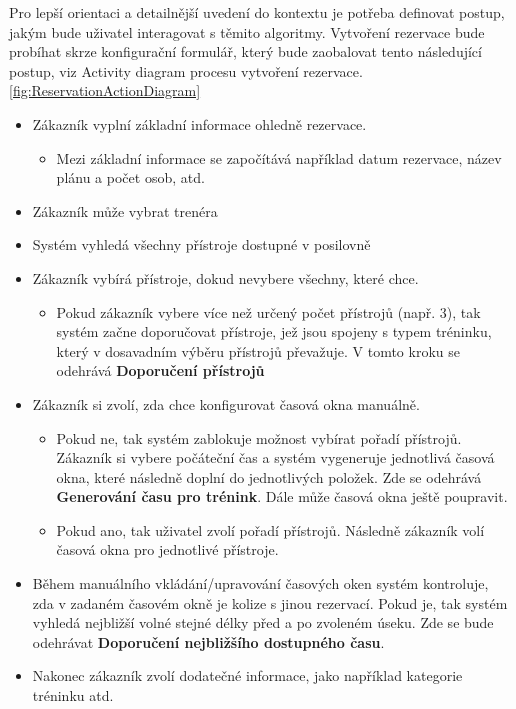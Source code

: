Pro lepší orientaci a detailnější uvedení do kontextu je potřeba definovat postup, jakým bude uživatel interagovat s těmito algoritmy. Vytvoření rezervace bude probíhat skrze konfigurační formulář, který bude zaobalovat tento následující postup, viz Activity diagram procesu vytvoření rezervace. \ref{fig:ReservationActionDiagram}
\begin{itemize}
  \item Zákazník vyplní základní informace ohledně rezervace.
    \begin{itemize}
      \item Mezi základní informace se započítává například datum rezervace, název plánu a počet osob, atd.
    \end{itemize}
  \item Zákazník může vybrat trenéra
  \item Systém vyhledá všechny přístroje dostupné v posilovně
  \item Zákazník vybírá přístroje, dokud nevybere všechny, které chce.
    \begin{itemize}
        \item Pokud zákazník vybere více než určený počet přístrojů (např. 3), tak systém začne doporučovat přístroje, jež jsou spojeny s typem tréninku, který v dosavadním výběru přístrojů převažuje. V tomto kroku se odehrává \textbf{Doporučení přístrojů}
    \end{itemize}
  \item Zákazník si zvolí, zda chce konfigurovat časová okna manuálně.
      \begin{itemize}
        \item Pokud ne, tak systém zablokuje možnost vybírat pořadí přístrojů. Zákazník si vybere počáteční čas a systém vygeneruje jednotlivá časová okna, které následně doplní do jednotlivých položek. Zde se odehrává \textbf{Generování času pro trénink}. Dále může časová okna ještě poupravit. 
        \item Pokud ano, tak uživatel zvolí pořadí přístrojů. Následně zákazník volí časová okna pro jednotlivé přístroje. 
    \end{itemize}
    
  \item Během manuálního vkládání/upravování časových oken systém kontroluje, zda v zadaném časovém okně je kolize s jinou rezervací. Pokud je, tak systém vyhledá nejbližší volné stejné délky před a po zvoleném úseku. Zde se bude odehrávat \textbf{Doporučení nejbližšího dostupného času}.
  \item Nakonec zákazník zvolí dodatečné informace, jako například kategorie tréninku atd.
\end{itemize}

